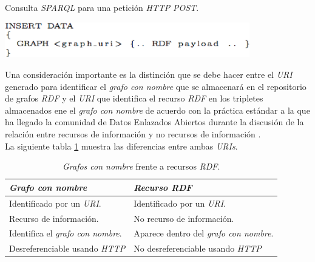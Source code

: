 \begin{table}
\vspace{2.4in}
\caption{Consulta \textit{SPARQL} para una petici\'on \textit{HTTP} \textit{POST}.}
\includegraphics[width=0.8\textwidth]{tabla7}
\label{tabla7}
\end{table}

Una consideraci\'on importante es la distinci\'on que se debe hacer entre el \textit{URI} generado para identificar el \textit{grafo con nombre} que se almacenar\'a en el repositorio de grafos \textit{RDF} y el \textit{URI} que identifica el recurso \textit{RDF} en los tripletes almacenados ene el \textit{grafo con nombre} de acuerdo con la pr\'actica est\'andar a la que ha llegado la comunidad de Datos Enlazados Abiertos durante la discusi\'on de la relaci\'on entre recursos de informaci\'on y no recursos de informaci\'on \cite{fielding2005httprange}.\\
La siguiente tabla \ref{named_graph_vs_resource_uri} muestra las diferencias entre ambas \textit{URIs}.\\

\begin{table}
\centering
\caption{\textit{Grafos con nombre} frente a recursos \textit{RDF}.}
\label{named_graph_vs_resource_uri}
\begin{center}
\begin{tabular}{|l|l|}\hline
\textbf{\textit{Grafo con nombre}} & \textbf{\textit{Recurso RDF}} \\\hline
Identificado por un \textit{URI}. & Identificado por un \textit{URI}. \\
Recurso de informaci\'on. & No recurso de informaci\'on.\\
Identifica el \textit{grafo con nombre}. & Aparece dentro del \textit{grafo con nombre}.\\
Desreferenciable usando \textit{HTTP} & No desreferenciable usando \textit{HTTP}\\\hline
\end{tabular}
\end{center}
\end{table}


